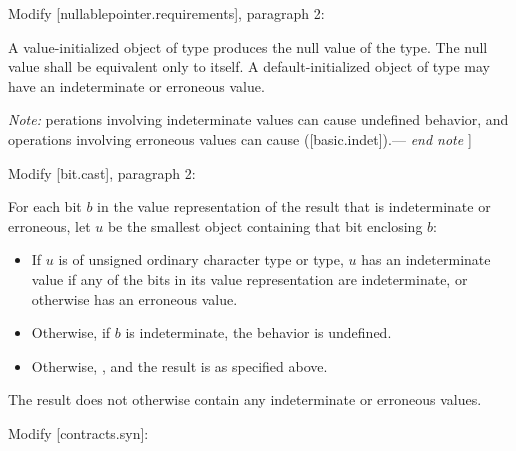 Modify [nullablepointer.requirements], paragraph 2:

\begin{adjustwidth}{0.5cm}{0.5cm}
A value-initialized object of type  produces the null value of the type. The null value shall be equivalent only to itself. A default-initialized object of type  may have an indeterminate or erroneous value.

\emph{Note:} perations involving indeterminate values can cause undefined behavior, and operations involving erroneous values can cause  ([basic.indet]).--- \emph{end note} ]
\end{adjustwidth}

Modify [bit.cast], paragraph 2:

\begin{adjustwidth}{0.5cm}{0.5cm}
For each bit $b$ in the value representation of the result that is indeterminate or erroneous, let $u$ be the smallest object containing that bit enclosing $b$:
\begin{itemize}
\item  If $u$ is of unsigned ordinary character type or  type, $u$ has an indeterminate value if any of the bits in its value representation are indeterminate, or otherwise has an erroneous value.
\item Otherwise, if $b$ is indeterminate, the behavior is undefined.
\item Otherwise, , and the result is as specified above.
\end{itemize}
The result does not otherwise contain any indeterminate or erroneous values.
\end{adjustwidth}

Modify [contracts.syn]:


